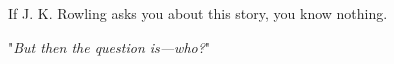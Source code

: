 If J. K. Rowling asks you about this story, you know nothing.

"\emph{But then the question is---who?}"
